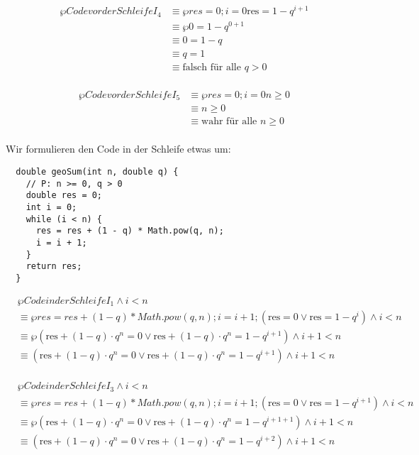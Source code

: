 \documentclass{bschlangaul-aufgabe}
\begin{document}
\begin{liAntwort}
\begin{align*}
\wp{Code vor der Schleife}{I_4}
& \equiv \wp{res = 0; i = 0}{\text{res} = 1 - q^{i+1}} \\
& \equiv \wp{}{0 = 1 - q^{0+1}} \\
& \equiv 0 = 1 - q \\
& \equiv q = 1 \\
& \equiv \text{falsch für alle } q > 0\\
\end{align*}

\begin{align*}
\wp{Code vor der Schleife}{I_5}
& \equiv \wp{res = 0; i = 0}{n \geq 0} \\
& \equiv n \geq 0 \\
& \equiv \text{wahr für alle } n \geq 0\\
\end{align*}

%


Wir formulieren den Code in der Schleife etwas um:

\begin{verbatim}
  double geoSum(int n, double q) {
    // P: n >= 0, q > 0
    double res = 0;
    int i = 0;
    while (i < n) {
      res = res + (1 - q) * Math.pow(q, n);
      i = i + 1;
    }
    return res;
  }
\end{verbatim}

\begin{align*}
&\wp{Code in der Schleife}{I_1 \land i < n}\\
&\equiv \wp{res = res + (1-q) * Math.pow(q, n); i = i + 1;}
{(\text{res} = 0 \lor \text{res} = 1 - q^i) \land i < n} \\
&\equiv \wp{}
{(\text{res} + (1-q) \cdot q^n = 0 \lor \text{res} + (1-q) \cdot q^n = 1 - q^{i + 1}) \land i + 1 < n} \\
&\equiv
(\text{res} + (1-q) \cdot q^n = 0 \lor \text{res} + (1-q) \cdot q^n = 1 - q^{i + 1}) \land i + 1 < n \\
\end{align*}

\begin{align*}
&\wp{Code in der Schleife}{I_3 \land i < n}\\
& \equiv \wp{res = res + (1-q) * Math.pow(q, n); i = i + 1;}
{(\text{res} = 0 \lor \text{res} = 1 - q^{i+1}) \land i < n} \\
& \equiv \wp{}
{(\text{res} + (1-q) \cdot q^n = 0 \lor \text{res} + (1-q) \cdot q^n  = 1 - q^{i + 1 + 1}) \land i + 1 < n} \\
& \equiv
(\text{res} + (1-q) \cdot q^n = 0 \lor \text{res} + (1-q) \cdot q^n  = 1 - q^{i + 2}) \land i + 1 < n \\
\end{align*}


\end{liAntwort}
\end{document}
